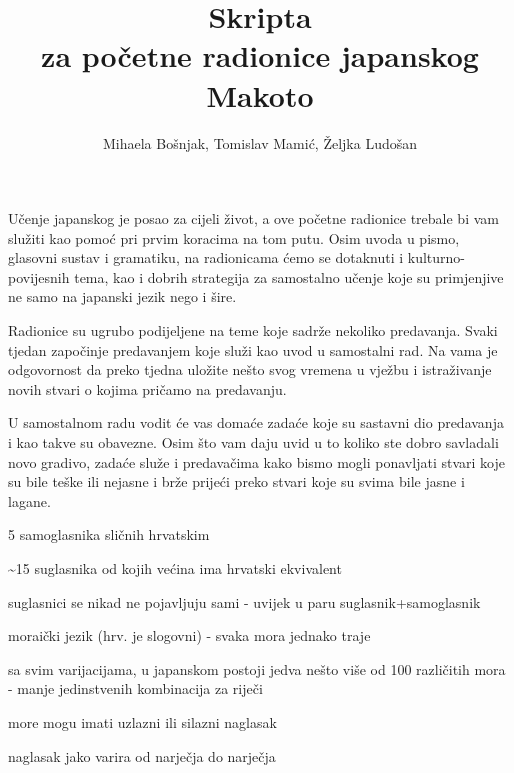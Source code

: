 
\usepackage{graphicx}
\usepackage{caption}
\usepackage{tikz}
\usepackage{xcolor}
\usepackage{wasysym}
\title{Skripta\\
\large za početne radionice japanskog\\
Makoto}
\author{Mihaela Bošnjak, Tomislav Mamić, Željka Ludošan}


{\let\cleardoublepage\clearpage
\maketitle
\tableofcontents}
\newpage
{}

	
	
	Učenje japanskog je posao za cijeli život, a ove početne radionice trebale bi vam služiti kao pomoć pri prvim koracima na tom putu. Osim uvoda u pismo, glasovni sustav i gramatiku, na radionicama ćemo se dotaknuti i kulturno-povijesnih tema, kao i dobrih strategija za samostalno učenje koje su primjenjive ne samo na japanski jezik nego i šire.
	
	
	Radionice su ugrubo podijeljene na teme koje sadrže nekoliko predavanja. Svaki tjedan započinje predavanjem koje služi kao uvod u samostalni rad. Na vama je odgovornost da preko tjedna uložite nešto svog vremena u vježbu i istraživanje novih stvari o kojima pričamo na predavanju.
	
	
	U samostalnom radu vodit će vas domaće zadaće koje su sastavni dio predavanja i kao takve su obavezne. Osim što vam daju uvid u to koliko ste dobro savladali novo gradivo, zadaće služe i predavačima kako bismo mogli ponavljati stvari koje su bile teške ili nejasne i brže prijeći preko stvari koje su svima bile jasne i lagane.
	
	
	\begin{hyou}
		\item 5 samoglasnika sličnih hrvatskim
		\item \textasciitilde15 suglasnika od kojih većina ima hrvatski ekvivalent
		\item suglasnici se nikad ne pojavljuju sami - uvijek u paru suglasnik+samoglasnik
		\item moraički jezik (hrv. je slogovni) - svaka mora jednako traje
		\item sa svim varijacijama, u japanskom postoji jedva nešto više od 100 različitih mora - manje jedinstvenih kombinacija za riječi
		\item more mogu imati uzlazni ili silazni naglasak
		\item naglasak jako varira od narječja do narječja
	\end{hyou}

